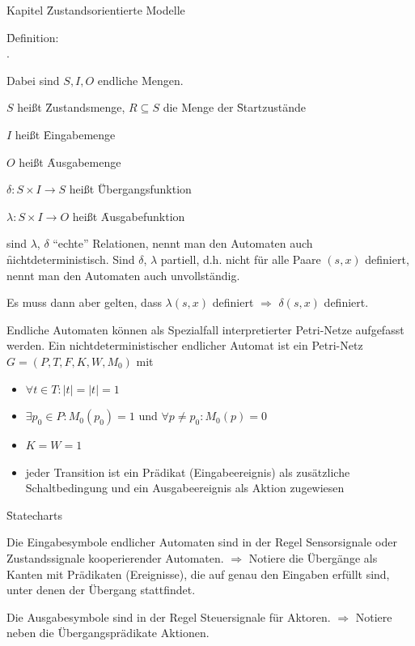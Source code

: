 \begin{chapter}{Kapitel}
\f{Zustandsorientierte Modelle}
\vspace*{6pt}

\noindent \f{Definition}: \\ . 

\noindent Dabei sind $S,I,O$ endliche Mengen.

\qquad \qquad $S$ heißt \f{Zustandsmenge}, $R \subseteq S$ die Menge der \f{Startzustände} 

\qquad \qquad $I$ heißt \f{Eingabemenge} 

\qquad \qquad $O$ heißt \f{Ausgabemenge} 

\qquad \qquad $\delta:S\times I \rightarrow S$ heißt \f{Übergangsfunktion} 

\qquad \qquad $\lambda:S\times I\rightarrow O$ heißt \f{Ausgabefunktion}

\noindent sind $\lambda$, $\delta$ ``echte'' Relationen, nennt man den Automaten auch \f{nichtdeterministisch}. Sind $\delta$, $\lambda$ partiell, d.h. nicht 
für alle Paare $(s,x)$ definiert, nennt man den Automaten auch unvollständig. 

\noindent Es muss dann aber gelten, dass $\lambda(s,x)$ definiert $\Rightarrow$ $\delta(s,x)$ definiert.

\noindent Endliche Automaten können als Spezialfall interpretierter Petri-Netze aufgefasst werden. Ein nichtdeterministischer endlicher Automat ist ein 
Petri-Netz $G=(P,T,F,K,W,M_0)$ mit 
\begin{itemize}
 \item $\forall t\in T:|$\textbullet$t|=|t$\textbullet$|=1$
 \item $\exists p_0\in P:M_0(p_0) = 1$ und $\forall p\neq p_0:M_0(p) = 0$
 \item $K=W=1$
 \item jeder Transition ist ein Prädikat (Eingabeereignis) als zusätzliche Schaltbedingung und ein Ausgabeereignis als Aktion zugewiesen
\end{itemize}

\f{Statecharts}

\noindent Die Eingabesymbole endlicher Automaten sind in der Regel Sensorsignale oder Zustandssignale kooperierender Automaten. $\Rightarrow$ Notiere die Übergänge als 
Kanten mit Prädikaten (Ereignisse), die auf genau den Eingaben erfüllt sind, unter denen der Übergang stattfindet. 

\noindent Die Ausgabesymbole sind in der Regel Steuersignale für Aktoren. $\Rightarrow$ Notiere neben die Übergangsprädikate Aktionen.


\end{chapter}
